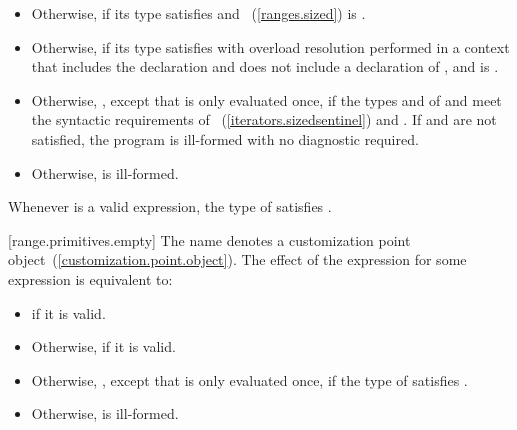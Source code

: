 \begin{addedblock}
\begin{itemize}
\item
  Otherwise,  if its type 
  satisfies  and
  ~(\ref{ranges.sized}) is
  .

\item
  Otherwise,  if its type 
  satisfies  with overload resolution
  performed in a context that includes the declaration
   and does not include
  a declaration of , and
   is .

\item
  Otherwise,
  , except that 
  is only evaluated once, if the types  and  of
   and  meet the
  syntactic requirements of
  ~(\ref{iterators.sizedsentinel}) and
  . If  and
   are not satisfied, the program is ill-formed with no
  diagnostic required.

\item
  Otherwise,  is ill-formed.
\end{itemize}

\pnum
\enternote Whenever  is a valid expression, the
type of  satisfies . \exitnote

[range.primitives.empty]{}
\pnum
The name  denotes a customization point
object~(\ref{customization.point.object}). The effect of the expression
 for some expression  is
equivalent to:

\begin{itemize}
\item
   if it is valid.

\item
  Otherwise,  if it is valid.

\item
  Otherwise, ,
  except that  is only evaluated once, if the type of
   satisfies .

\item
  Otherwise,  is ill-formed.
\end{itemize}


\end{addedblock}
